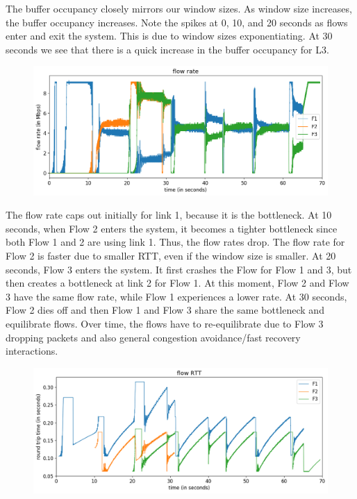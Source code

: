 \documentclass{article}
\begin{document}
The buffer occupancy closely mirrors our window sizes. As window size increases, the buffer occupancy increases. Note the spikes at 0, 10, and 20 seconds as flows enter and exit the system. This is due to window sizes exponentiating. At 30 seconds we see that there is a quick increase in the buffer occupancy for L3.

\begin{figure}[H]
\centering
\includegraphics[width = \textwidth]{test_case2_reno flow rate.png}
\end{figure}

The flow rate caps out initially for link 1, because it is the bottleneck. At 10 seconds, when Flow 2 enters the system, it becomes a tighter bottleneck since both Flow 1 and 2 are using link 1. Thus, the flow rates drop. The flow rate for Flow 2 is faster due to smaller RTT, even if the window size is smaller. At 20 seconds, Flow 3 enters the system. It first crashes the Flow for Flow 1 and 3, but then creates a bottleneck at link 2 for Flow 1. At this moment, Flow 2 and Flow 3 have the same flow rate, while Flow 1 experiences a lower rate. At 30 seconds, Flow 2 dies off and then Flow 1 and Flow 3 share the same bottleneck and equilibrate flows.  Over time, the flows have to re-equilibrate due to Flow 3 dropping packets and also general congestion avoidance/fast recovery interactions.

\begin{figure}[H]
\centering
\includegraphics[width = \textwidth]{test_case2_reno flow RTT.png}
\end{figure}
\end{document}
